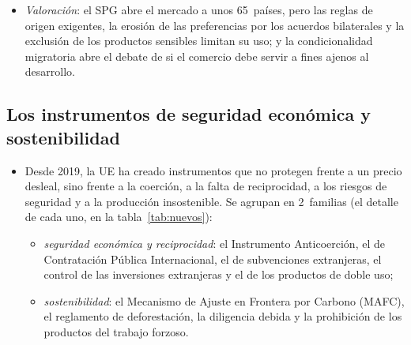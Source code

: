 \documentclass[11pt]{article}
\begin{document}
\begin{itemize}
\begin{itemize}
  \item el Acuerdo de París entre los convenios exigidos y una retirada más rápida en casos graves;
  \item una salvaguardia automática para el arroz;
  \item la pérdida del SPG cuando un país firma un acuerdo de libre comercio con la UE (Indonesia y Kenia salen en 2027), y una transición de 3~años para los países que dejan de ser menos adelantados (Bangladés, Laos y Nepal, en 2026).
  \end{itemize}
\item \emph{Valoración}: el SPG abre el mercado a unos 65~países, pero las reglas de origen exigentes, la erosión de las preferencias por los acuerdos bilaterales y la exclusión de los productos sensibles limitan su uso; y la condicionalidad migratoria abre el debate de si el comercio debe servir a fines ajenos al desarrollo.
\end{itemize}

\subsection{Los instrumentos de seguridad\cortetitulo{} económica y sostenibilidad}\label{sec:nuevos}

\begin{itemize}
\item Desde 2019, la UE ha creado instrumentos que no protegen frente a un precio desleal, sino frente a la coerción, a la falta de reciprocidad, a los riesgos de seguridad y a la producción insostenible. Se agrupan en 2~familias (el detalle de cada uno, en la tabla~\ref{tab:nuevos})\nocite{CE2025SeguridadEconomica}:
  \begin{itemize}
  \item \emph{seguridad económica y reciprocidad}: el Instrumento Anticoerción, el de Contratación Pública Internacional, el de subvenciones extranjeras, el control de las inversiones extranjeras y el de los productos de doble uso;
  \item \emph{sostenibilidad}: el Mecanismo de Ajuste en Frontera por Carbono (MAFC), el reglamento de deforestación, la diligencia debida y la prohibición de los productos del trabajo forzoso.
  \end{itemize}
\end{itemize}
\end{document}
